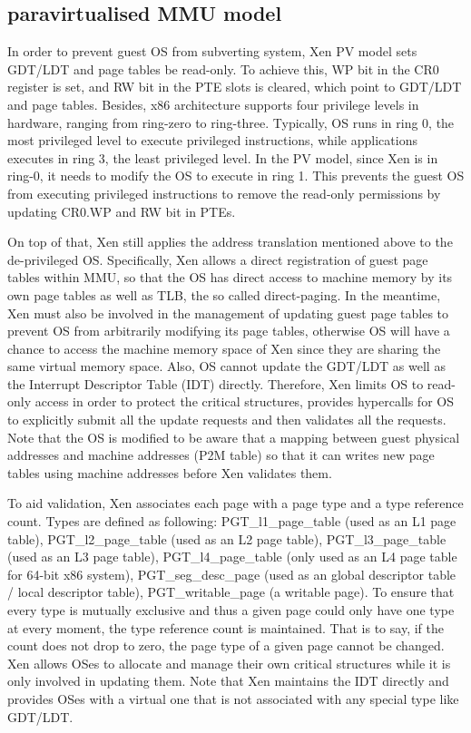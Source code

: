 \subsection{paravirtualised MMU model}

In order to prevent guest OS from subverting system, Xen PV model sets GDT/LDT and page tables be read-only. To achieve this, WP bit in the CR0 register is set, and RW bit in the PTE slots is cleared, which point to GDT/LDT and page tables. Besides, x86 architecture supports four privilege levels in hardware, ranging from ring-zero to ring-three. Typically, OS runs in ring 0, the most privileged level to execute privileged instructions, while applications executes in ring 3, the least privileged level. In the PV model, since Xen is in ring-0, it needs to modify the OS to execute in ring 1. This prevents the guest OS from executing privileged instructions to remove the read-only permissions by updating CR0.WP and RW bit in PTEs.

On top of that, Xen still applies the address translation mentioned above to the de-privileged OS. Specifically, Xen allows a direct registration of guest page tables within MMU, so that the OS has direct access to machine memory by its own page tables as well as TLB, the so called direct-paging. In the meantime, Xen must also be involved in the management of updating guest page tables to prevent OS from arbitrarily modifying its page tables, otherwise OS will have a chance to access the machine memory space of Xen since they are sharing the same virtual memory space. Also, OS cannot update the GDT/LDT as well as the Interrupt Descriptor Table (IDT) directly. Therefore, Xen limits OS to read-only access in order to protect the critical structures, provides hypercalls for OS to explicitly submit all the update requests and then validates all the requests. Note that the OS is modified to be aware that a mapping between guest physical addresses and machine addresses (P2M table) so that it can writes new page tables using machine addresses before Xen validates them.

To aid validation, Xen associates each page with a page type and a type reference count. Types are defined as following: PGT\_l1\_page\_table (used as an L1 page table), PGT\_l2\_page\_table (used as an L2 page table), PGT\_l3\_page\_table (used as an L3 page table), PGT\_l4\_page\_table (only used as an L4 page table for 64-bit x86 system), PGT\_seg\_desc\_page (used as an global descriptor table / local descriptor table), PGT\_writable\_page (a writable page). To ensure that every type is mutually exclusive and thus a given page could only have one type at every moment, the type reference count is maintained. That is to say, if the count does not drop to zero, the page type of a given page cannot be changed. Xen allows OSes to allocate and manage their own critical structures while it is only involved in updating them. Note that Xen maintains the IDT directly and provides OSes with a virtual one that is not associated with any special type like GDT/LDT.

